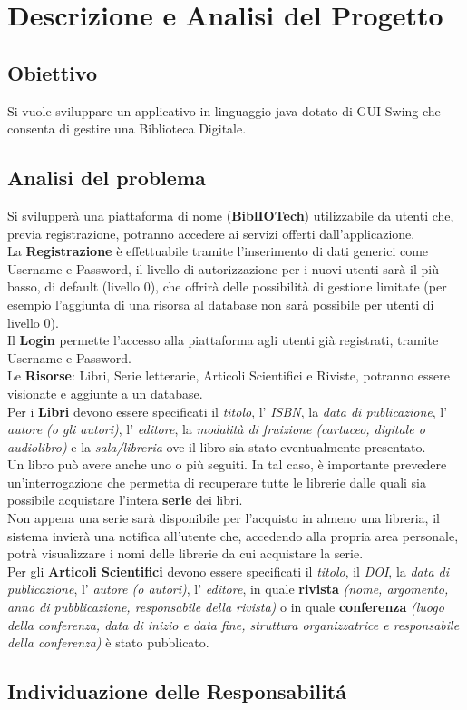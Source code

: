 \chapter{Descrizione e Analisi del Progetto}
\section{Obiettivo}
Si vuole sviluppare un applicativo in linguaggio java dotato di GUI Swing che 
consenta di gestire una Biblioteca Digitale.
\section{Analisi del problema}
Si svilupper\`a una piattaforma di nome (\textbf{BiblIOTech}) utilizzabile da utenti
che, previa registrazione, potranno accedere ai servizi offerti dall'applicazione.
\\ \indent La \textbf{Registrazione} \`e effettuabile tramite l'inserimento di dati
generici come Username e Password, il livello di autorizzazione per i nuovi utenti sar\`a
il più basso, di default (livello 0), che offrir\`a delle possibilit\`a di gestione limitate 
(per esempio l'aggiunta di una risorsa al database non sar\`a possibile per utenti di livello 0).
\\ \indent Il \textbf{Login} permette l'accesso alla piattaforma agli utenti gi\`a registrati,
 tramite Username e Password.
\\ \indent Le \textbf{Risorse}: Libri, Serie letterarie, Articoli Scientifici e Riviste, 
potranno essere visionate e aggiunte a un database.
\\ \indent Per i \textbf{Libri} devono essere specificati il \emph{titolo}, l' \emph{ISBN}, la
\emph{data di publicazione}, l' \emph{autore (o gli autori)}, l' \emph{editore}, la 
\emph{modalit\`a di fruizione (cartaceo, digitale o audiolibro)} e la \emph{sala/libreria} 
ove il libro sia stato eventualmente presentato.\\ 

Un libro pu\`o avere anche uno o pi\`u seguiti. In tal caso, \`e 
importante prevedere un'interrogazione che permetta di recuperare tutte le librerie dalle quali
sia possibile acquistare l'intera \textbf{serie} dei libri.
\\
Non appena una serie sar\`a disponibile per l'acquisto in almeno una libreria, il sistema 
invier\`a una notifica all'utente che, accedendo alla propria area personale, potr\`a visualizzare
i nomi delle librerie da cui acquistare la serie.
\\ \indent Per gli \textbf{Articoli Scientifici} devono essere specificati il \emph{titolo}, 
il \emph{DOI}, la \emph{data di publicazione}, l' \emph{autore (o autori)}, l' \emph{editore}, 
in quale \textbf{rivista} \emph{(nome, argomento, anno di pubblicazione, responsabile della 
rivista)} o in quale \textbf{conferenza} \emph{(luogo della conferenza, data di inizio e data 
fine, struttura organizzatrice e responsabile della conferenza)} \`e stato pubblicato.
\section{Individuazione delle Responsabilit\'a}